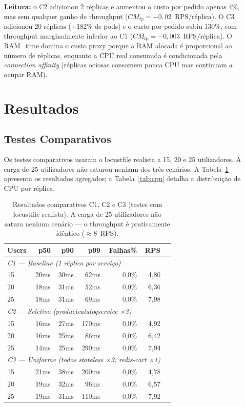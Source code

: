 \documentclass[manuscript,screen,review]{acmart}
\begin{document}
\textbf{Leitura:} o C2 adicionou 2 réplicas e aumentou o custo por pedido apenas 4\%, mas sem qualquer ganho de throughput ($CM_{tp}=-0{,}02$~RPS/réplica). O C3 adicionou 20 réplicas (+182\% de pods) e o custo por pedido subiu 130\%, com throughput marginalmente inferior ao C1 ($CM_{tp}=-0{,}003$~RPS/réplica). O RAM\_time domina o custo proxy porque a RAM alocada é proporcional ao número de réplicas, enquanto a CPU real consumida é condicionada pela \textit{connection affinity} (réplicas ociosas consomem pouca CPU mas continuam a ocupar RAM).

\section{Resultados}
\label{sec:resultados}

\subsection{Testes Comparativos}
\label{sec:comparativos}

Os testes comparativos usaram o locustfile realista a 15, 20 e 25 utilizadores. A carga de 25 utilizadores não saturou nenhum dos três cenários. A Tabela~\ref{tab:comparativos} apresenta os resultados agregados; a Tabela~\ref{tab:cpu} detalha a distribuição de CPU por réplica.

\begin{table}[t]
\caption{Resultados comparativos C1, C2 e C3 (testes com locustfile realista). A carga de 25 utilizadores não satura nenhum cenário — o throughput é praticamente idêntico ($\approx$8~RPS).}
\label{tab:comparativos}
\begin{tabular}{lrrrrrr}
\toprule
\textbf{Users} & \textbf{p50} & \textbf{p90} & \textbf{p99} & \textbf{Falhas\%} & \textbf{RPS} \\
\midrule
\multicolumn{6}{l}{\textit{C1 — Baseline (1 réplica por serviço)}} \\
15 & 20ms & 30ms & 62ms & 0,0\% & 4,80 \\
20 & 18ms & 31ms & 52ms & 0,0\% & 6,36 \\
25 & 18ms & 31ms & 69ms & 0,0\% & 7,98 \\
\midrule
\multicolumn{6}{l}{\textit{C2 — Seletivo (productcatalogservice ×3)}} \\
15 & 16ms & 27ms & 170ms & 0,0\% & 4,92 \\
20 & 16ms & 25ms & 86ms & 0,0\% & 6,42 \\
25 & 14ms & 25ms & 290ms & 0,0\% & 7,94 \\
\midrule
\multicolumn{6}{l}{\textit{C3 — Uniforme (todos stateless ×3; redis-cart ×1)}} \\
15 & 21ms & 38ms & 200ms & 0,0\% & 4,78 \\
20 & 19ms & 32ms & 96ms & 0,0\% & 6,57 \\
25 & 19ms & 31ms & 110ms & 0,0\% & 7,92 \\
\bottomrule
\end{tabular}
\end{table}
\end{document}
